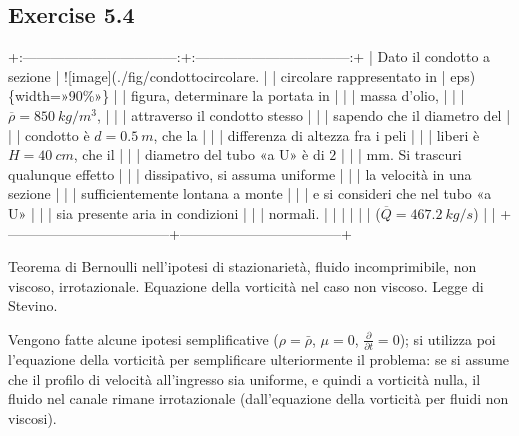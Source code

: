 \documentclass[letterpaper,10pt,italian]{jupyterBook}
\begin{document}
\subsection{Exercise 5.4}
\label{\detokenize{polimi/fluidmechanics-ita/template/capitoli/05_bernoulli/0504in:exercise-5-4}}\label{\detokenize{polimi/fluidmechanics-ita/template/capitoli/05_bernoulli/0504in:fluid-mechanics-bernoulli-ex-04}}\label{\detokenize{polimi/fluidmechanics-ita/template/capitoli/05_bernoulli/0504in::doc}}
\sphinxAtStartPar
+:———————————:+:———————————:+
| Dato il condotto a sezione        | !{[}image{]}(./fig/condottocircolare. |
| circolare rappresentato in        | eps)\{width=»90\%»\}                 |
| figura, determinare la portata in |                                   |
| massa d’olio,                     |                                   |
| \(\overline{\rho} = 850\ kg/m^3\),  |                                   |
| attraverso il condotto stesso     |                                   |
| sapendo che il diametro del       |                                   |
| condotto è \(d=0.5\ m\), che la     |                                   |
| differenza di altezza fra i peli  |                                   |
| liberi è \(H=40\ cm\), che il       |                                   |
| diametro del tubo «a U» è di \(2\)  |                                   |
| mm. Si trascuri qualunque effetto |                                   |
| dissipativo, si assuma uniforme   |                                   |
| la velocità in una sezione        |                                   |
| sufficientemente lontana a monte  |                                   |
| e si consideri che nel tubo «a U» |                                   |
| sia presente aria in condizioni   |                                   |
| normali.                          |                                   |
|                                   |                                   |
| (\(\overline{Q}= 467.2\  kg/s\))    |                                   |
+———————————–+———————————–+

\sphinxAtStartPar
Teorema di Bernoulli nell’ipotesi di stazionarietà, fluido
incomprimibile, non viscoso, irrotazionale. Equazione della vorticità
nel caso non viscoso. Legge di Stevino.

\sphinxAtStartPar
Vengono fatte alcune ipotesi semplificative (\(\rho = \bar{\rho}\),
\(\mu=0\), \(\frac{\partial}{\partial t}=0\)); si utilizza poi l’equazione
della vorticità per semplificare ulteriormente il problema: se si assume
che il profilo di velocità all’ingresso sia uniforme, e quindi a
vorticità nulla, il fluido nel canale rimane irrotazionale
(dall’equazione della vorticità per fluidi non viscosi).
\end{document}
